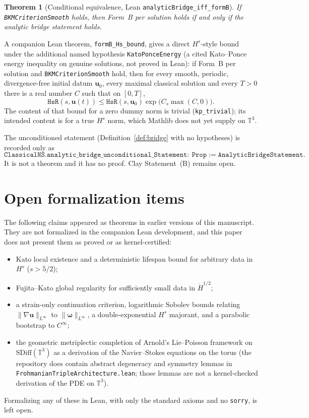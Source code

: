 \documentclass[11pt,reqno]{amsart}
\newtheorem{theorem}{Theorem}[section]
\theoremstyle{definition}
\newcommand{\T}{\mathbb{T}}
\newcommand{\uvec}{\mathbf{u}}
\newcommand{\wvec}{\boldsymbol{\omega}}
\numberwithin{equation}{section}
\begin{document}
\begin{theorem}[Conditional equivalence, Lean \texttt{analyticBridge\_iff\_formB}]\label{thm:A}
If \texttt{BKMCriterionSmooth} holds, then Form~B per solution holds if and only if the analytic bridge statement holds.
\end{theorem}

A companion Lean theorem, \texttt{formB\_Hs\_bound}, gives a direct \(H^s\)-style bound under the additional named hypothesis \texttt{KatoPonceEnergy} (a cited Kato--Ponce energy inequality on genuine solutions, not proved in Lean): if Form~B per solution and \texttt{BKMCriterionSmooth} hold, then for every smooth, periodic, divergence-free initial datum \(\uvec_0\), every maximal classical solution and every \(T>0\) there is a real number \(C\) such that on \([0,T]\),
\[
\texttt{HsR}(s,\uvec(t))\le \texttt{HsR}(s,\uvec_0)\exp\bigl(C_s\max(C,0)\bigr).
\]
The content of that bound for a zero dummy norm is trivial (\texttt{kp\_trivial}); its intended content is for a true \(H^s\) norm, which Mathlib does not yet supply on \(\T^3\).

The unconditioned statement (Definition~\ref{def:bridge} with no hypotheses) is recorded only as
\[
\texttt{ClassicalNS.analytic\_bridge\_unconditional\_Statement}
:\ \texttt{Prop}
:= \texttt{AnalyticBridgeStatement}.
\]
It is not a theorem and it has no proof. Clay Statement~(B) remains open.

\section{Open formalization items}

The following claims appeared as theorems in earlier versions of this manuscript. They are not formalized in the companion Lean development, and this paper does not present them as proved or as kernel-certified:
\begin{itemize}
\item Kato local existence and a deterministic lifespan bound for arbitrary data in \(H^s\) (\(s>5/2\));
\item Fujita--Kato global regularity for sufficiently small data in \(\dot H^{1/2}\);
\item a strain-only continuation criterion, logarithmic Sobolev bounds relating \(\|\nabla\uvec\|_{L^\infty}\) to \(\|\wvec\|_{L^\infty}\), a double-exponential \(H^s\) majorant, and a parabolic bootstrap to \(C^\infty\);
\item the geometric metriplectic completion of Arnold's Lie--Poisson framework on \(\mathrm{SDiff}(\T^3)\) as a derivation of the Navier--Stokes equations on the torus (the repository does contain abstract degeneracy and symmetry lemmas in \texttt{FrohmanianTripleArchitecture.lean}; those lemmas are not a kernel-checked derivation of the PDE on \(\T^3\)).
\end{itemize}
Formalizing any of these in Lean, with only the standard axioms and no \texttt{sorry}, is left open.
\end{document}
